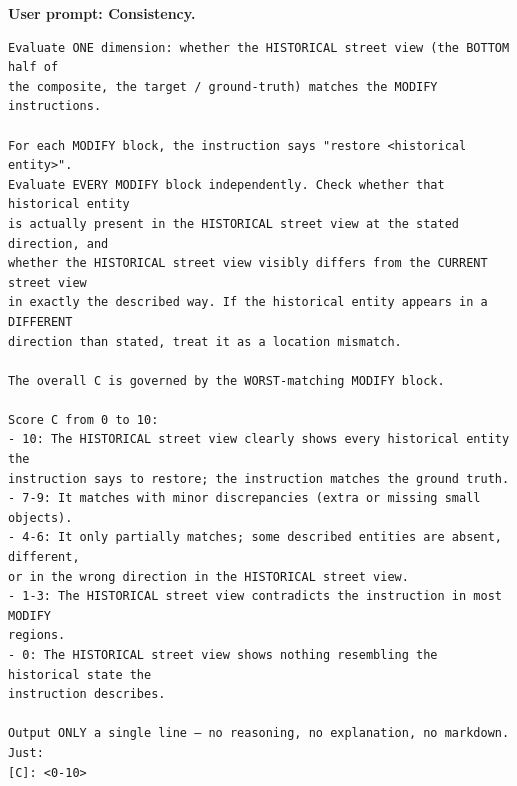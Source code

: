 \noindent\textbf{User prompt: Consistency.}\par
\begingroup\fontsize{8}{10}\selectfont
\begin{promptbox}
\begin{verbatim}
Evaluate ONE dimension: whether the HISTORICAL street view (the BOTTOM half of
the composite, the target / ground-truth) matches the MODIFY instructions.

For each MODIFY block, the instruction says "restore <historical entity>".
Evaluate EVERY MODIFY block independently. Check whether that historical entity
is actually present in the HISTORICAL street view at the stated direction, and
whether the HISTORICAL street view visibly differs from the CURRENT street view
in exactly the described way. If the historical entity appears in a DIFFERENT
direction than stated, treat it as a location mismatch.

The overall C is governed by the WORST-matching MODIFY block.

Score C from 0 to 10:
- 10: The HISTORICAL street view clearly shows every historical entity the
instruction says to restore; the instruction matches the ground truth.
- 7-9: It matches with minor discrepancies (extra or missing small objects).
- 4-6: It only partially matches; some described entities are absent, different,
or in the wrong direction in the HISTORICAL street view.
- 1-3: The HISTORICAL street view contradicts the instruction in most MODIFY
regions.
- 0: The HISTORICAL street view shows nothing resembling the historical state the
instruction describes.

Output ONLY a single line — no reasoning, no explanation, no markdown. Just:
[C]: <0-10>
\end{verbatim}
\end{promptbox}
\endgroup

